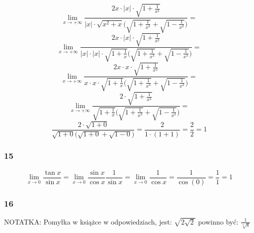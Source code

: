 \documentclass{article}
\begin{document}
\begin{equation*}
    \lim_{x \to +\infty} \frac{2x \cdot |x| \cdot \sqrt{1 + \frac{1}{x^{2}}}} {|x| \cdot \sqrt{x^2 + x}\Bigg(\sqrt{1 + \frac{1}{x^3}} + \sqrt{1 - \frac{1}{x^3}}\Bigg)} = 
\end{equation*}
\begin{equation*}
    \lim_{x \to +\infty} \frac{2x \cdot |x| \cdot \sqrt{1 + \frac{1}{x^{2}}}} {|x| \cdot |x| \cdot \sqrt{1 + \frac{1}{x}}\Bigg(\sqrt{1 + \frac{1}{x^3}} + \sqrt{1 - \frac{1}{x^3}}\Bigg)} = 
\end{equation*}
\begin{equation*}
    \lim_{x \to +\infty} \frac{2x \cdot x \cdot \sqrt{1 + \frac{1}{x^{2}}}} {x \cdot x \cdot \sqrt{1 + \frac{1}{x}}\Bigg(\sqrt{1 + \frac{1}{x^3}} + \sqrt{1 - \frac{1}{x^3}}\Bigg)} = 
\end{equation*}
\begin{equation*}
    \lim_{x \to +\infty} \frac{2 \cdot \sqrt{1 + \frac{1}{x^{2}}}} {\sqrt{1 + \frac{1}{x}}\Bigg(\sqrt{1 + \frac{1}{x^3}} + \sqrt{1 - \frac{1}{x^3}}\Bigg)} = 
\end{equation*}
\begin{equation*}
    \frac{2 \cdot \sqrt{1 + 0}} {\sqrt{1 + 0}\Bigg(\sqrt{1 + 0} + \sqrt{1 - 0}\Bigg)} = \frac{2}{1 \cdot (1 + 1)} = \frac{2}{2} = 1
\end{equation*}

\subsubsection*{15}

\begin{equation*}
    \lim_{x \to 0} \frac{\tan x}{\sin x} = \lim_{x \to 0} \frac{\sin x}{\cos x}\frac{1}{\sin x} = \lim_{x \to 0} \frac{1}{\cos x} = \frac{1}{\cos(0)} = \frac{1}{1} = 1
\end{equation*}

\subsubsection*{16}

\begin{center}
    NOTATKA: Pomyłka w książce w odpowiedziach, jest: \(\sqrt{2\sqrt{2}}\) powinno być: \(\frac{1}{\sqrt[4]{8}}\)
\end{center}
\end{document}
